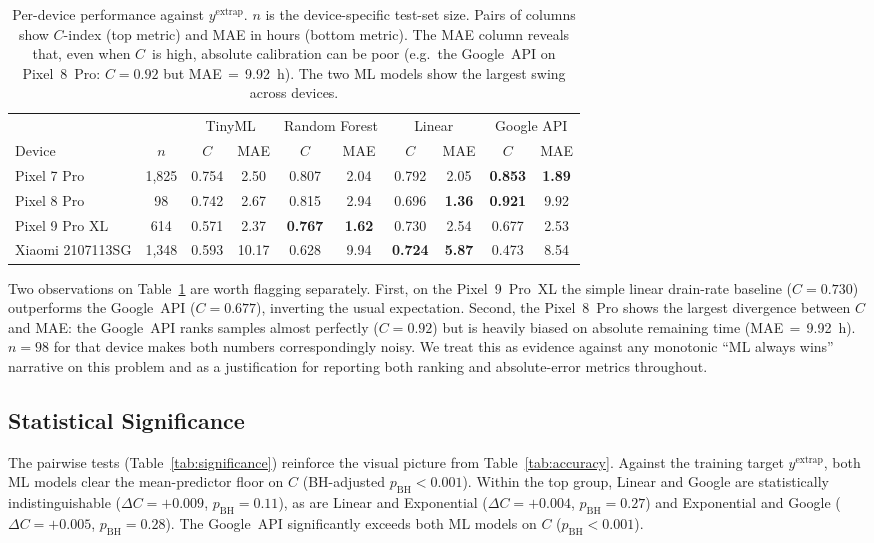 \documentclass[conference]{IEEEtran}
\begin{document}
\begin{table}[t]
\caption{Per-device performance against $y^{\text{extrap}}$. $n$ is the
device-specific test-set size. Pairs of columns show $C$-index (top
metric) and MAE in hours (bottom metric). The MAE column reveals
that, even when $C$~is high, absolute calibration can be poor (e.g.\
the Google~API on Pixel~8~Pro: $C{=}0.92$ but MAE$\,{=}\,$\SI{9.92}{\hour}).
The two ML models show the largest swing across devices.}
\label{tab:perdevice}
\centering
\small
\begin{tabular}{lc|cc|cc|cc|cc}
\toprule
& & \multicolumn{2}{c|}{TinyML} & \multicolumn{2}{c|}{Random Forest} & \multicolumn{2}{c|}{Linear} & \multicolumn{2}{c}{Google API} \\
Device & $n$ & $C$ & MAE & $C$ & MAE & $C$ & MAE & $C$ & MAE \\
\midrule
Pixel 7 Pro          & 1{,}825 & 0.754 & 2.50 & 0.807 & 2.04 & 0.792 & 2.05 & \textbf{0.853} & \textbf{1.89} \\
Pixel 8 Pro          & \phantom{0}\phantom{0}98    & 0.742 & 2.67 & 0.815 & 2.94 & 0.696 & \textbf{1.36} & \textbf{0.921} & 9.92 \\
Pixel 9 Pro XL       & \phantom{0}614   & 0.571 & 2.37 & \textbf{0.767} & \textbf{1.62} & 0.730 & 2.54 & 0.677 & 2.53 \\
Xiaomi 2107113SG     & 1{,}348 & 0.593 & 10.17 & 0.628 & 9.94 & \textbf{0.724} & \textbf{5.87} & 0.473 & 8.54 \\
\bottomrule
\end{tabular}
\end{table}

Two observations on Table~\ref{tab:perdevice} are worth flagging
separately. First, on the Pixel~9~Pro~XL the simple linear drain-rate
baseline ($C{=}0.730$) outperforms the Google~API ($C{=}0.677$),
inverting the usual expectation. Second, the Pixel~8~Pro shows the
largest divergence between $C$ and MAE: the Google~API ranks samples
almost perfectly ($C{=}0.92$) but is heavily biased on absolute
remaining time (MAE$\,{=}\,$\SI{9.92}{\hour}). $n{=}98$ for that
device makes both numbers correspondingly noisy. We treat this as
evidence against any monotonic ``ML always wins'' narrative on this
problem and as a justification for reporting both ranking and
absolute-error metrics throughout.

\subsection{Statistical Significance}
The pairwise tests (Table~\ref{tab:significance}) reinforce the visual
picture from Table~\ref{tab:accuracy}. Against the training target
$y^{\text{extrap}}$, both ML models clear the mean-predictor floor on
$C$ (BH-adjusted $p_{\text{BH}} < 0.001$). Within the top group,
Linear and Google are statistically indistinguishable
($\Delta C{=}{+}0.009$, $p_{\text{BH}}{=}0.11$), as are Linear and
Exponential ($\Delta C{=}{+}0.004$, $p_{\text{BH}}{=}0.27$) and
Exponential and Google ($\Delta C{=}{+}0.005$, $p_{\text{BH}}{=}0.28$).
The Google~API significantly exceeds both ML models on $C$
($p_{\text{BH}} < 0.001$).
\end{document}
